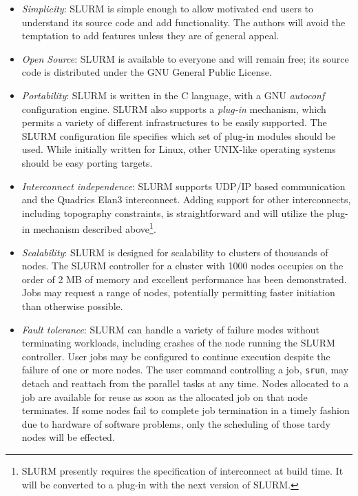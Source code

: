\begin{itemize}
\item {\em Simplicity}: SLURM is simple enough to allow motivated end users
to understand its source code and add functionality.  The authors will 
avoid the temptation to add features unless they are of general appeal. 

\item {\em Open Source}: SLURM is available to everyone and will remain 
free; its source code is distributed under the GNU General Public 
License\cite{GPL2002}.

\item {\em Portability}: SLURM is written in the C language, with a GNU 
{\em autoconf} configuration engine.  SLURM also supports a {\em plug-in} 
mechanism, which permits a variety of different infrastructures to be 
easily supported. The SLURM configuration file specifies which set of 
plug-in modules should be used. While initially written for Linux, other 
UNIX-like operating systems should be easy porting targets.

\item {\em Interconnect independence}: SLURM supports UDP/IP based
communication and the Quadrics Elan3 interconnect.  Adding support for 
other interconnects, including topography constraints, is straightforward 
and will utilize the plug-in mechanism described above\footnote{SLURM 
presently requires the specification of interconnect at build time. 
It will be converted to a plug-in with the next version of SLURM.}.

\item {\em Scalability}: SLURM is designed for scalability to clusters of
thousands of nodes. The SLURM controller for a cluster with 1000 nodes 
occupies on the order of 2 MB of memory and excellent performance has 
been demonstrated. Jobs may request a range of nodes, potentially 
permitting faster initiation than otherwise possible.

\item {\em Fault tolerance}: SLURM can handle a variety of failure modes
without terminating workloads, including crashes of the node running 
the SLURM controller. 
User jobs may be configured to continue execution despite the failure 
of one or more nodes. 
The user command controlling a job, {\tt srun}, may detach and reattach 
from the parallel tasks at any time. 
Nodes allocated to a job are available for reuse as soon as the allocated 
job on that node terminates. If some nodes fail to complete job termination 
in a timely fashion due to hardware of software problems, only the 
scheduling of those tardy nodes will be effected.


\end{itemize}
